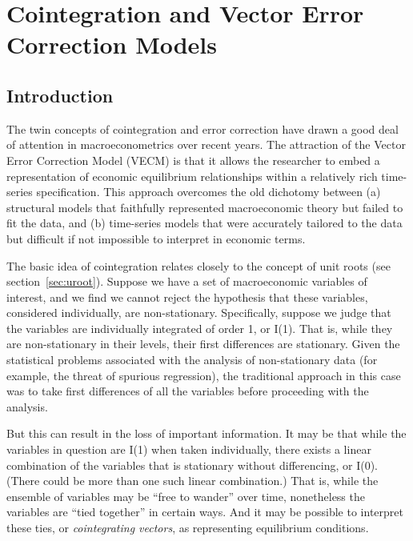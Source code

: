 \chapter{Cointegration and Vector Error Correction Models}
\label{chap:vecm}

\section{Introduction}
\label{sec:VECM-intro}

The twin concepts of cointegration and error correction have drawn a
good deal of attention in macroeconometrics over recent years.  The
attraction of the Vector Error Correction Model (VECM) is that it
allows the researcher to embed a representation of economic
equilibrium relationships within a relatively rich time-series
specification.  This approach overcomes the old dichotomy between (a)
structural models that faithfully represented macroeconomic theory but
failed to fit the data, and (b) time-series models that were
accurately tailored to the data but difficult if not impossible to
interpret in economic terms.

The basic idea of cointegration relates closely to the concept of unit
roots (see section~\ref{sec:uroot}).  Suppose we have a set of
macroeconomic variables of interest, and we find we cannot reject the
hypothesis that these variables, considered individually, are
non-stationary.  Specifically, suppose we judge that the
variables are individually integrated of order 1, or I(1).  That is,
while they are non-stationary in their levels, their first differences
are stationary.  Given the statistical problems associated with the
analysis of non-stationary data (for example, the threat of spurious
regression), the traditional approach in this case was to take first
differences of all the variables before proceeding with the analysis.

But this can result in the loss of important information.  It may be
that while the variables in question are I(1) when taken individually,
there exists a linear combination of the variables that is stationary
without differencing, or I(0).  (There could be more than one such
linear combination.)  That is, while the ensemble of variables may be
``free to wander'' over time, nonetheless the variables are ``tied
together'' in certain ways.  And it may be possible to interpret these
ties, or \emph{cointegrating vectors}, as representing equilibrium
conditions.

